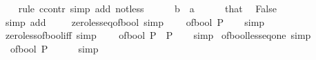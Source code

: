 \begin{isabellebody}
\ \ \isamarkupfalse%
\ {\isacharparenleft}{\kern0pt}rule\ ccontr{\isacharcomma}{\kern0pt}\ simp\ add{\isacharcolon}{\kern0pt}\ not{\isacharunderscore}{\kern0pt}less{\isacharparenright}{\kern0pt}\isanewline
\ \ \ \ \isamarkupfalse%
\ {\isachardoublequoteopen}b\ {\isasymle}\ a{\isachardoublequoteclose}\isanewline
\ \ \ \ \isamarkupfalse%
\ that\ \isamarkupfalse%
\ False\isanewline
\ \ \ \ \ \ \isamarkupfalse%
\ {\isacharparenleft}{\kern0pt}simp\ add{\isacharcolon}{\kern0pt}\ {\isacharparenright}{\kern0pt}\isanewline
\ \ \isamarkupfalse%
\isanewline
{}\isamarkupfalse%
%
\endisatagproof
{\isafoldproof}%
%
\isadelimproof
\isanewline
%
\endisadelimproof
\isanewline
{}\isamarkupfalse%
\ zero{\isacharunderscore}{\kern0pt}less{\isacharunderscore}{\kern0pt}eq{\isacharunderscore}{\kern0pt}of{\isacharunderscore}{\kern0pt}bool\ {\isacharbrackleft}{\kern0pt}simp{\isacharbrackright}{\kern0pt}{\isacharcolon}{\kern0pt}\isanewline
\ \ {\isacartoucheopen}{}\ {\isasymle}\ of{\isacharunderscore}{\kern0pt}bool\ P{\isacartoucheclose}\isanewline
%
\isadelimproof
\ \ %
\endisadelimproof
%
\isatagproof
{}\isamarkupfalse%
\ simp%
\endisatagproof
{\isafoldproof}%
%
\isadelimproof
\isanewline
%
\endisadelimproof
\isanewline
{}\isamarkupfalse%
\ zero{\isacharunderscore}{\kern0pt}less{\isacharunderscore}{\kern0pt}of{\isacharunderscore}{\kern0pt}bool{\isacharunderscore}{\kern0pt}iff\ {\isacharbrackleft}{\kern0pt}simp{\isacharbrackright}{\kern0pt}{\isacharcolon}{\kern0pt}\isanewline
\ \ {\isacartoucheopen}{}\ {\isacharless}{\kern0pt}\ of{\isacharunderscore}{\kern0pt}bool\ P\ {\isasymlongleftrightarrow}\ P{\isacartoucheclose}\isanewline
%
\isadelimproof
\ \ %
\endisadelimproof
%
\isatagproof
{}\isamarkupfalse%
\ simp%
\endisatagproof
{\isafoldproof}%
%
\isadelimproof
\isanewline
%
\endisadelimproof
\isanewline
{}\isamarkupfalse%
\ of{\isacharunderscore}{\kern0pt}bool{\isacharunderscore}{\kern0pt}less{\isacharunderscore}{\kern0pt}eq{\isacharunderscore}{\kern0pt}one\ {\isacharbrackleft}{\kern0pt}simp{\isacharbrackright}{\kern0pt}{\isacharcolon}{\kern0pt}\isanewline
\ \ {\isacartoucheopen}of{\isacharunderscore}{\kern0pt}bool\ P\ {\isasymle}\ {}{\isacartoucheclose}\isanewline
%
\isadelimproof
\ \ %
\endisadelimproof
%
\isatagproof
{}\isamarkupfalse%
\ simp%
\endisatagproof
{\isafoldproof}%
%
\isadelimproof
\isanewline
%
\endisadelimproof
\isanewline
{}\isamarkupfalse%

\end{isabellebody}
